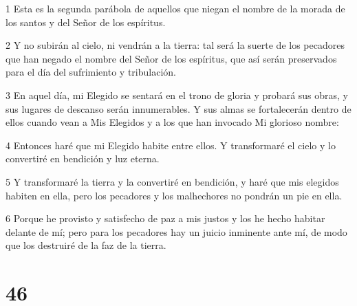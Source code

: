 \par 1 Esta es la segunda parábola de aquellos que niegan el nombre de la morada de los santos y del Señor de los espíritus.
\par 2 Y no subirán al cielo, ni vendrán a la tierra: tal será la suerte de los pecadores que han negado el nombre del Señor de los espíritus, que así serán preservados para el día del sufrimiento y tribulación.
\par 3 En aquel día, mi Elegido se sentará en el trono de gloria y probará sus obras, y sus lugares de descanso serán innumerables. Y sus almas se fortalecerán dentro de ellos cuando vean a Mis Elegidos y a los que han invocado Mi glorioso nombre:
\par 4 Entonces haré que mi Elegido habite entre ellos. Y transformaré el cielo y lo convertiré en bendición y luz eterna.
\par 5 Y transformaré la tierra y la convertiré en bendición, y haré que mis elegidos habiten en ella, pero los pecadores y los malhechores no pondrán un pie en ella.
\par 6 Porque he provisto y satisfecho de paz a mis justos y los he hecho habitar delante de mí; pero para los pecadores hay un juicio inminente ante mí, de modo que los destruiré de la faz de la tierra.

\chapter{46}

